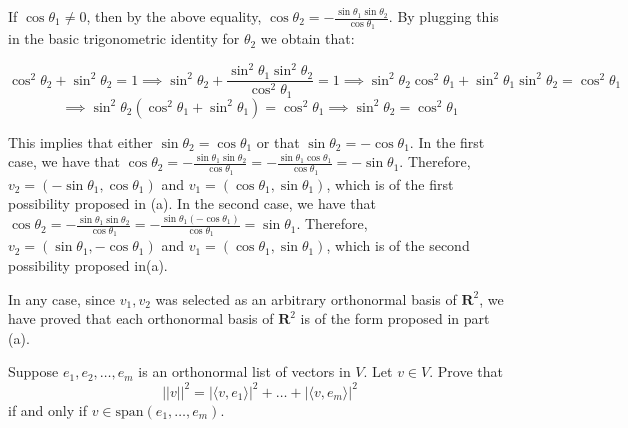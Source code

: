\begin{solution}
If $\cos \theta_1 \neq 0$, then by the above equality, $\cos \theta_2 = -\frac{\sin \theta_1 \sin \theta_2}{\cos \theta_1}$. By plugging this in the basic trigonometric identity for $\theta_2$ we obtain that:

$$\cos^2 \theta_2 + \sin^2 \theta_2 = 1 \implies \sin^2 \theta_2 + \frac{\sin^2 \theta_1 \sin^2 \theta_2}{\cos^2 \theta_1} = 1 \implies \sin^2 \theta_2 \cos^2 \theta_1 + \sin^2 \theta_1 \sin^2 \theta_2 = \cos^2 \theta_1$$
$$\implies \sin^2 \theta_2(\cos^2 \theta_1 + \sin^2 \theta_1) = \cos^2 \theta_1 \implies \sin^2 \theta_2 = \cos^2 \theta_1$$

This implies that either $\sin \theta_2 = \cos \theta_1$ or that $\sin \theta_2 = -\cos \theta_1$. In the first case, we have that $\cos \theta_2 = -\frac{\sin \theta_1 \sin \theta_2}{\cos \theta_1} = -\frac{\sin \theta_1 \cos \theta_1}{\cos \theta_1}  = -\sin \theta_1$. Therefore, $v_2 = (-\sin \theta_1, \cos \theta_1)$ and $v_1 = (\cos \theta_1, \sin \theta_1)$, which is of the first possibility proposed in (a). In the second case, we have that $\cos \theta_2 = -\frac{\sin \theta_1 \sin \theta_2}{\cos \theta_1} = -\frac{\sin \theta_1 (-\cos \theta_1)}{\cos \theta_1} = \sin \theta_1$. Therefore, $v_2 = (\sin \theta_1, -\cos \theta_1)$ and $v_1 = (\cos \theta_1, \sin \theta_1)$, which is of the second possibility proposed in(a).

In any case, since $v_1, v_2$ was selected as an arbitrary orthonormal basis of $\mathbf{R}^2$, we have proved that each orthonormal basis of $\mathbf{R}^2$ is of the form proposed in part (a).

\end{solution}

\newpage
\begin{exercise}{2}
    Suppose $e_1, e_2, \ldots, e_m$ is an orthonormal list of vectors in $V$. Let $v \in V$. Prove that
    $$\lvert \lvert v \rvert \rvert^2 = \lvert \langle v, e_1 \rangle \rvert^2 + \ldots + \lvert \langle v, e_m \rangle \rvert^2$$
    if and only if $v \in \text{span}(e_1, \ldots, e_m)$.
\end{exercise}

